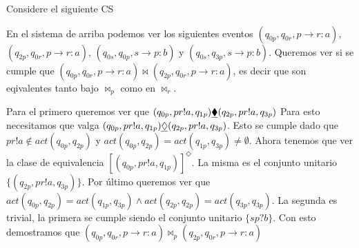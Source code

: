 \begin{example}
\label{ex:equiveventos}
Considere el siguiente CS

\qquad
{} 
\qquad
{} 

En el sistema de arriba podemos ver los siguientes eventos $(q_{0p}, q_{0r}, p \rightarrow r:a)$, $(q_{2p}, q_{0r}, p \rightarrow r:a)$, $(q_{0s}, q_{0p}, s \rightarrow p:b)$ y $(q_{0s}, q_{3p}, s \rightarrow p:b)$. Queremos ver si se cumple que $(q_{0p}, q_{0r}, p \rightarrow r:a) \bowtie (q_{2p}, q_{0r}, p \rightarrow r:a)$, es decir que son eqivalentes tanto bajo $\bowtie_p$ como en $\bowtie_r$. 

Para el primero queremos ver que $(q_{0p}, pr!a, q_{1p}) \underline{\blacklozenge} (q_{2p}, pr!a, q_{3p})$
Para esto necesitamos que valga $(q_{0p}, pr!a, q_{1p}) \underline{\Diamond} (q_{2p}, pr!a, q_{3p})$. Esto se cumple dado que $pr!a \notin act(q_{0p},q_{2p})$ y $act(q_{0p},q_{2p}) = act(q_{1p},q_{3p}) \neq \emptyset$. Ahora tenemos que ver la clase de equivalencia $[(q_{0p}, pr!a, q_{1p})]^{\Diamond}$. La misma es el conjunto unitario $ \{(q_{2p}, pr!a, q_{3p})\}$. Por último queremos ver que  $act(q_{0p}, q_{2p}) = 
act(q_{1p}, q_{3p}) \land act(q_{2p}, q_{2p}) = act(q_{3p}, q_{3p})$. La segunda es trivial, la primera se cumple siendo el conjunto unitario $\{sp?b\}$. Con esto demostramos que $(q_{0p}, q_{0r}, p \rightarrow r:a) \bowtie_p (q_{2p}, q_{0r}, p \rightarrow r:a)$ 


\end{example}
